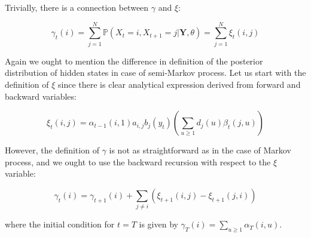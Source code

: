 \noindent Trivially, there is a connection between $\gamma$ and $\xi$:

\begin{equation}
    \gamma_t(i) = \sum_{j=1}^N \mathbb{P}(X_t=i, X_{t+1}=j|\textbf{Y},\theta) = \sum_{j=1}^N \xi_t(i,j)
\end{equation}

Again we ought to mention the difference in definition of the posterior distribution of hidden states in case of semi-Markov process. Let us start with the definition of $\xi$ since
there is clear analytical expression derived from forward and backward variables:

\begin{equation}
    \xi_t(i,j) = \alpha_{t-1}(i,1) a_{i,j} b_j(y_{t}) \left( \sum\limits_{u \geq 1} d_j(u) \beta_{t}(j,u) \right)
\end{equation}

\noindent However, the definition of $\gamma$ is not as straightforward as in the case of Markov process, and we ought to use the backward recursion with respect to the $\xi$ variable:

\begin{equation}
    \gamma_t(i) = \gamma_{t+1}(i) + \sum\limits_{j \neq i} \left( \xi_{t+1}(i,j) - \xi_{t+1}(j,i)\right)
\end{equation}

where the initial condition for $t=T$ is given by $\gamma_T(i) = \sum\limits_{u \geq 1} \alpha_T(i,u)$.

